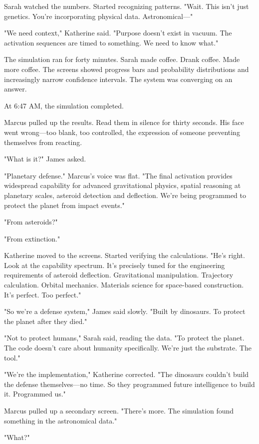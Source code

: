Sarah watched the numbers. Started recognizing patterns. "Wait. This isn't just genetics. You're incorporating physical data. Astronomical—"

"We need context," Katherine said. "Purpose doesn't exist in vacuum. The activation sequences are timed to something. We need to know what."

The simulation ran for forty minutes. Sarah made coffee. Drank coffee. Made more coffee. The screens showed progress bars and probability distributions and increasingly narrow confidence intervals. The system was converging on an answer.

At 6:47 AM, the simulation completed.

Marcus pulled up the results. Read them in silence for thirty seconds. His face went wrong—too blank, too controlled, the expression of someone preventing themselves from reacting.

"What is it?" James asked.

"Planetary defense." Marcus's voice was flat. "The final activation provides widespread capability for advanced gravitational physics, spatial reasoning at planetary scales, asteroid detection and deflection. We're being programmed to protect the planet from impact events."

"From asteroids?"

"From extinction."

Katherine moved to the screens. Started verifying the calculations. "He's right. Look at the capability spectrum. It's precisely tuned for the engineering requirements of asteroid deflection. Gravitational manipulation. Trajectory calculation. Orbital mechanics. Materials science for space-based construction. It's perfect. Too perfect."

"So we're a defense system," James said slowly. "Built by dinosaurs. To protect the planet after they died."

"Not to protect humans," Sarah said, reading the data. "To protect the planet. The code doesn't care about humanity specifically. We're just the substrate. The tool."

"We're the implementation," Katherine corrected. "The dinosaurs couldn't build the defense themselves—no time. So they programmed future intelligence to build it. Programmed us."

Marcus pulled up a secondary screen. "There's more. The simulation found something in the astronomical data."

"What?"

